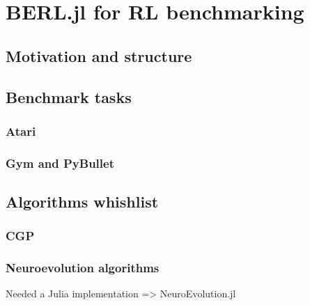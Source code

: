 \chapter{BERL.jl for RL benchmarking}
\label{sec:berl}

\section{Motivation and structure}

\section{Benchmark tasks}
\subsection{Atari}

\subsection{Gym and PyBullet}

\section{Algorithms whishlist}
\subsection{CGP}
\subsection{Neuroevolution algorithms}
Needed a Julia implementation => NeuroEvolution.jl

